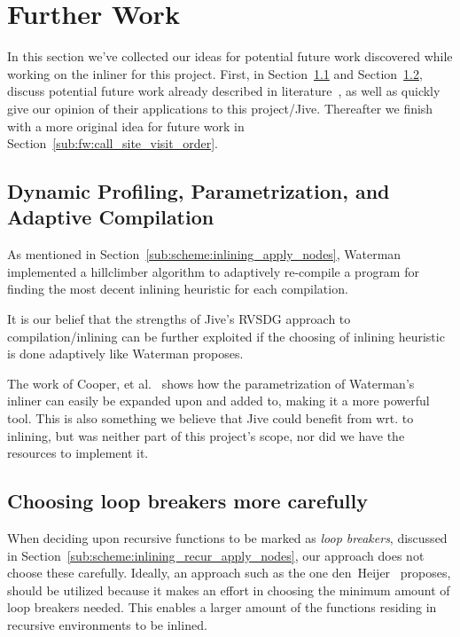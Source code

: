 
\clearpage
\section{Further Work}
\label{sec:further_work}

In this section we've collected our ideas for potential future work discovered
while working on the inliner for this project. First, in
Section~\ref{sub:fw:adaptiv_comp} and
Section~\ref{sub:fw:optimal_loop_breakers}, discuss potential future work
already described in
literature~\cite{AdaptvStratInlSubst,AdaptvCompilAndInlingWaterman,BasMscThesis}, as well as quickly give our opinion of their applications
to this project/Jive. Thereafter we finish with a more original idea for future
work in Section~\ref{sub:fw:call_site_visit_order}.

\subsection{Dynamic Profiling, Parametrization, and Adaptive Compilation}
\label{sub:fw:adaptiv_comp}

As mentioned in Section~\ref{sub:scheme:inlining_apply_nodes},
Waterman~\cite{AdaptvCompilAndInlingWaterman} implemented a hillclimber
algorithm to adaptively re-compile a program for finding the most decent
inlining heuristic for each compilation.

It is our belief that the strengths of Jive's RVSDG approach to
compilation/inlining can be further exploited if the choosing of inlining
heuristic is done adaptively like Waterman proposes.

The work of Cooper, et al.~\cite{AdaptvStratInlSubst} shows how the
parametrization of Waterman's~\cite{AdaptvCompilAndInlingWaterman} inliner can
easily be expanded upon and added to, making it a more powerful tool. This is
also something we believe that Jive could benefit from wrt. to inlining, but was
neither part of this project's scope, nor did we have the resources to implement
it.

\subsection{Choosing loop breakers more carefully}
\label{sub:fw:optimal_loop_breakers}

When deciding upon recursive functions to be marked as \textit{loop breakers},
discussed in Section~\ref{sub:scheme:inlining_recur_apply_nodes}, our approach
does not choose these carefully. Ideally, an approach such as the one
den~Heijer~\cite{BasMscThesis} proposes, should be utilized because it makes an
effort in choosing the minimum amount of loop breakers needed. This enables a
larger amount of the functions residing in recursive environments to be inlined.

